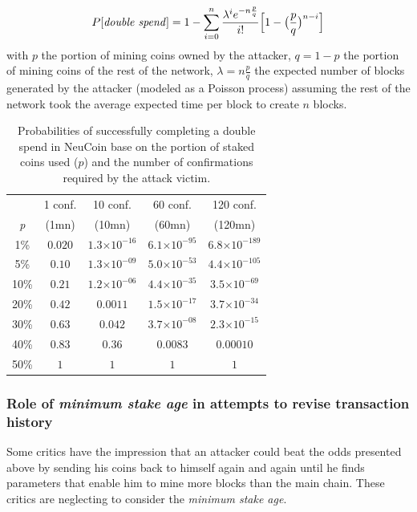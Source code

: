 \documentclass[a4paper,11pt]{article}
\providecommand{\e}[1]{\ensuremath{\times 10^{#1}}}
\begin{document}
 
$$ P[\text{\textit{double spend}}]= 1 - \sum\limits_{i=0}^n\frac{\lambda^{i}e^{-n\frac{p}{q}}}{i!} \Big[ 1- \big(\frac{p}{q}\big)^{n-i} \Big] $$
with $p$ the portion of mining coins owned by the attacker, $q=1-p$ the portion of mining coins of the rest of the network, $\lambda=n\frac{p}{q}$ the expected number of blocks generated by the attacker (modeled as a Poisson process) assuming the rest of the network took the average expected time per block to create $n$ blocks.

\vspace{2mm}

\begin{table}[htp]
	\begin{center}
		\begin{tabular}{ccccc}
		\toprule
			{} & {1 conf.} & {10 conf.} & {60 conf.} & {120 conf.}\\
			{\textit{p}} & {(1mn)} & {(10mn)} & {(60mn)} & {(120mn)}\\
			\midrule
			1\% & $0.020$ & $1.3\e{-16}$ & $6.1\e{-95}$ & $6.8\e{-189}$\\
			5\% & $0.10$ & $1.3\e{-09}$ & $5.0\e{-53}$ & $4.4\e{-105}$\\
			10\% & $0.21$ & $1.2\e{-06}$ & $4.4\e{-35}$ & $3.5\e{-69}$\\
			20\% & $0.42$ & $0.0011$ & $1.5\e{-17}$ & $3.7\e{-34}$\\
			30\% & $0.63$ & $0.042$ & $3.7\e{-08}$ & $2.3\e{-15}$\\
			40\% & $0.83$ & $0.36$ & $0.0083$ & $0.00010$\\
			50\% & $1$ & $1$ & $1$ & $1$\\
		\bottomrule
		\end{tabular}
		\caption{Probabilities of successfully completing a double spend in NeuCoin base on the portion of staked coins used ($p$) and the number of confirmations required by the attack victim.}
	\end{center}
\end{table}

\subsubsection*{Role of \textit{minimum stake age} in attempts to revise transaction history}

Some critics have the impression that an attacker could beat the odds presented above by sending his coins back to himself again and again until he finds parameters that enable him to mine more blocks than the main chain. These critics are neglecting to consider the \textit{minimum stake age}.
\end{document}

